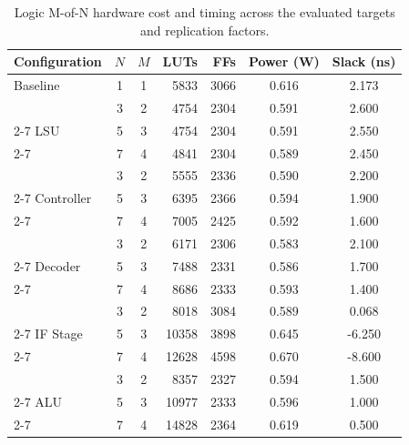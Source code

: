 \begin{table}[h]
\centering
\scriptsize
\setlength{\tabcolsep}{4.5pt}
\renewcommand{\arraystretch}{1.15}
\begin{tabular}{|l|c|c|r|r|c|c|}
\hline
\rowcolor{tableheader}\textbf{Configuration} &
\textbf{\(N\)} &
\textbf{\(M\)} &
\textbf{\acp{LUT}} &
\textbf{\acp{FF}} &
\textbf{Power (W)} &
\textbf{Slack (ns)} \\
\hline
\hline
\rowcolor{green!25}
Baseline &
1 &
1 &
5833 &
3066 &
0.616 &
2.173 \\
\hline
\rowcolor{yellow!10}
&
3 &
2 &
4754 &
2304 &
0.591 &
2.600 \\
\cline{2-7}
\rowcolor{yellow!10}
\ac{LSU} &
5 &
3 &
4754 &
2304 &
0.591 &
2.550 \\
\cline{2-7}
\rowcolor{yellow!10}
&
7 &
4 &
4841 &
2304 &
0.589 &
2.450 \\
\hline
\rowcolor{yellow!10}
&
3 &
2 &
5555 &
2336 &
0.590 &
2.200 \\
\cline{2-7}
\rowcolor{yellow!10}
Controller &
5 &
3 &
6395 &
2366 &
0.594 &
1.900 \\
\cline{2-7}
\rowcolor{yellow!10}
&
7 &
4 &
7005 &
2425 &
0.592 &
1.600 \\
\hline
\rowcolor{yellow!10}
&
3 &
2 &
6171 &
2306 &
0.583 &
2.100 \\
\cline{2-7}
\rowcolor{yellow!10}
Decoder &
5 &
3 &
7488 &
2331 &
0.586 &
1.700 \\
\cline{2-7}
\rowcolor{yellow!10}
&
7 &
4 &
8686 &
2333 &
0.593 &
1.400 \\
\hline
\rowcolor{yellow!10}
&
3 &
2 &
8018 &
3084 &
0.589 &
0.068 \\
\cline{2-7}
\cellcolor{yellow!10}
IF Stage &
\cellcolor{orange!20}5 &
\cellcolor{orange!20}3 &
\cellcolor{orange!20}10358 &
\cellcolor{orange!20}3898 &
\cellcolor{orange!20}0.645 &
\cellcolor{orange!20}-6.250 \\
\cline{2-7}
\cellcolor{yellow!10}
&
\cellcolor{orange!20}7 &
\cellcolor{orange!20}4 &
\cellcolor{orange!20}12628 &
\cellcolor{orange!20}4598 &
\cellcolor{orange!20}0.670 &
\cellcolor{orange!20}-8.600 \\
\hline
\rowcolor{yellow!10}
 &
3 &
2 &
8357 &
2327 &
0.594 &
1.500 \\
\cline{2-7}
\rowcolor{yellow!10}
\ac{ALU} &
5 &
3 &
10977 &
2333 &
0.596 &
1.000 \\
\cline{2-7}
\rowcolor{yellow!10}
&
7 &
4 &
14828 &
2364 &
0.619 &
0.500 \\
\hline
\end{tabular}
\caption{Logic M-of-N hardware cost and timing across the evaluated targets and replication factors.}
\label{tab:chap9-logicRedundancy-cost}
\end{table}


